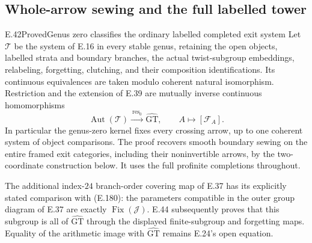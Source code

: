 \subsection{Whole-arrow sewing and the full labelled tower}

\begin{result}{E.42}{Proved}{Genus zero classifies the ordinary labelled completed exit system}
Let $\mathcal T$ be the system of E.16 in every stable genus,
retaining the open objects, labelled strata and boundary branches,
the actual twist-subgroup embeddings, relabeling, forgetting,
clutching, and their composition identifications.  Its continuous
equivalences are taken modulo coherent natural isomorphism.
Restriction and the extension of E.39 are mutually inverse
continuous homomorphisms
\[
 \operatorname{Aut}(\mathcal T)
       \xrightarrow{\ \operatorname{res}_0\ }\widehat{\mathrm{GT}},
 \qquad A\longmapsto[\mathcal F_A].                          \tag{E.180}
\]
In particular the genus-zero kernel fixes every crossing arrow,
up to one coherent system of object comparisons.  The proof
recovers smooth boundary sewing on the entire framed exit
categories, including their noninvertible arrows, by the
two-coordinate construction below.  It uses the full profinite
completions throughout.

The additional index-$24$ branch-order covering map of E.37
has its explicitly stated comparison with (E.180): the
parameters compatible in the outer group diagram of E.37 are exactly
$\operatorname{Fix}(\mathcal J)$.  E.44 subsequently proves
that this subgroup is all of $\widehat{\mathrm{GT}}$ through
the displayed finite-subgroup and forgetting maps.
Equality of the arithmetic image with
$\widehat{\mathrm{GT}}$ remains E.24's open equation.
\end{result}
